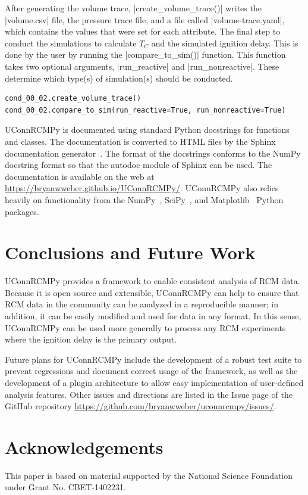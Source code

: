 \documentclass[12pt]{../ussci}
\begin{document}
After generating the volume trace, \python|create_volume_trace()| writes the
\python|volume.csv| file, the pressure trace file, and a file called
\python|volume-trace.yaml|, which contains the values that were set for each
attribute. The final step to conduct the simulations to calculate \(T_C\) and
the simulated ignition delay. This is done by the user by running the
\python|compare_to_sim()| function. This function takes two optional arguments,
\python|run_reactive| and \python|run_nonreactive|. These determine which
type(s) of simulation(s) should be conducted.

\begin{verbatim}
cond_00_02.create_volume_trace()
cond_00_02.compare_to_sim(run_reactive=True, run_nonreactive=True)
\end{verbatim}


UConnRCMPy is documented using standard Python docstrings for functions and
classes. The documentation is converted to HTML files by the Sphinx
documentation generator~\autocite{Brandl2016}. The format of the docstrings
conforms to the NumPy docstring format so that the autodoc module of Sphinx can
be used. The documentation is available on the web at
\url{https://bryanwweber.github.io/UConnRCMPy/}. UConnRCMPy also relies heavily
on functionality from the NumPy~\autocite{vanderWalt2011},
SciPy~\autocite{Jones2001}, and Matplotlib~\autocite{Hunter2007} Python
packages.

\section{Conclusions and Future Work}\label{conclusions-and-future-work}

UConnRCMPy provides a framework to enable consistent analysis of RCM data.
Because it is open source and extensible, UConnRCMPy can help to ensure that RCM
data in the community can be analyzed in a reproducible manner; in addition, it
can be easily modified and used for data in any format. In this sense,
UConnRCMPy can be used more generally to process any RCM experiments where the
ignition delay is the primary output.

Future plans for UConnRCMPy include the development of a robust test suite to
prevent regressions and document correct usage of the framework, as well as the
development of a plugin architecture to allow easy implementation of
user-defined analysis features. Other issues and directions are listed in the
Issue page of the GitHub repository
\url{https://github.com/bryanwweber/uconnrcmpy/issues/}.

\section{Acknowledgements}\label{acknowledgements}

This paper is based on material supported by the National Science
Foundation under Grant No. CBET-1402231.

\printbibliography
\end{document}
